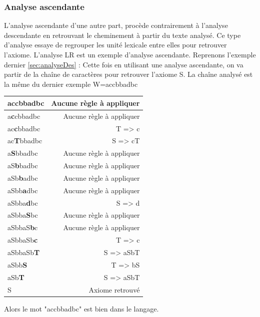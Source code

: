 \documentclass{article}
\begin{document}
\subsubsection{Analyse ascendante}
L’analyse ascendante d’une autre part, procède contrairement à l’analyse descendante en retrouvant le cheminement à partir du texte analysé. Ce type d’analyse essaye de regrouper les unité lexicale entre elles pour retrouver l’axiome. L’analyse LR est un exemple d’analyse ascendante.
Reprenons l'exemple dernier \ref{sec:analyseDes} :
Cette fois en utilisant une analyse ascendante, on va partir de la chaîne de caractères pour retrouver l'axiome S.
La chaîne analysé est la même du dernier exemple \newline W=accbbadbc\newline\newline\newline
\begin{tabular}{|E|D|}
\hline
\textbf{a}ccbbadbc & Aucune règle à appliquer\\
\hline
a\textbf{c}cbbadbc & Aucune règle à appliquer\\
\hline
ac\textbf{c}bbadbc & T => c\\
\hline
ac\textbf{T}bbadbc & S => cT\\
\hline
a\textbf{S}bbadbc & Aucune règle à appliquer\\
\hline
aS\textbf{b}badbc & Aucune règle à appliquer\\
\hline
aSb\textbf{b}adbc & Aucune règle à appliquer\\
\hline
aSbb\textbf{a}dbc & Aucune règle à appliquer\\
\hline
aSbba\textbf{d}bc & S => d\\
\hline
aSbba\textbf{S}bc & Aucune règle à appliquer\\
\hline
aSbbaS\textbf{b}c & Aucune règle à appliquer\\
\hline
aSbbaSb\textbf{c} & T => c\\
\hline
aSbbaSb\textbf{T} & S => aSbT\\
\hline
aSbb\textbf{S} & T => bS\\
\hline
aSb\textbf{T} & S => aSbT\\
\hline
S & Axiome retrouvé\\
\hline
\end{tabular}
\newline\newline\newline
Alors le mot "accbbadbc" est bien dans le langage.
\end{document}
